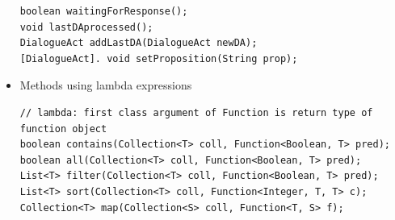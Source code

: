 \begin{itemize}
\begin{lstlisting}
boolean waitingForResponse();
void lastDAprocessed();
DialogueAct addLastDA(DialogueAct newDA);
[DialogueAct]. void setProposition(String prop);
\end{lstlisting}

\item Methods using lambda expressions
\begin{lstlisting}
// lambda: first class argument of Function is return type of function object
boolean contains(Collection<T> coll, Function<Boolean, T> pred);
boolean all(Collection<T> coll, Function<Boolean, T> pred);
List<T> filter(Collection<T> coll, Function<Boolean, T> pred);
List<T> sort(Collection<T> coll, Function<Integer, T, T> c);
Collection<T> map(Collection<S> coll, Function<T, S> f);
\end{lstlisting}

\end{itemize}

